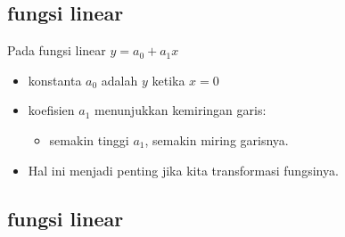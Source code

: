 \documentclass[
  letterpaper,
  DIV=11,
  numbers=noendperiod]{scrartcl}
\providecommand{\tightlist}{%
  \setlength{\itemsep}{0pt}\setlength{\parskip}{0pt}}\usepackage{longtable,booktabs,array}
\begin{document}
\hypertarget{fungsi-linear-1}{%
\subsection{fungsi linear}\label{fungsi-linear-1}}

Pada fungsi linear \(y=a_0+a_1x\)

\begin{itemize}
\item
  konstanta \(a_0\) adalah \(y\) ketika \(x=0\)
\item
  koefisien \(a_1\) menunjukkan kemiringan garis:

  \begin{itemize}
  \tightlist
  \item
    semakin tinggi \(a_1\), semakin miring garisnya.
  \end{itemize}
\item
  Hal ini menjadi penting jika kita transformasi fungsinya.
\end{itemize}

\hypertarget{fungsi-linear-2}{%
\subsection{fungsi linear}\label{fungsi-linear-2}}
\end{document}
